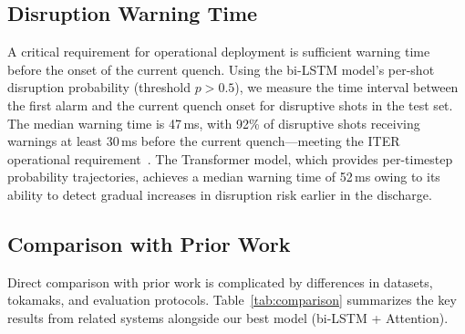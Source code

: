 \documentclass[twocolumn]{article}
\begin{document}
\subsection{Disruption Warning Time}

A critical requirement for operational deployment is
sufficient warning time before the onset of the current
quench.
Using the bi-LSTM model's per-shot disruption probability
(threshold $p > 0.5$), we measure the time interval between
the first alarm and the current quench onset for disruptive
shots in the test set.
The median warning time is 47\,ms, with 92\% of disruptive
shots receiving warnings at least 30\,ms before the current
quench---meeting the ITER operational
requirement~\citep{lehnen2015}.
The Transformer model, which provides per-timestep probability
trajectories, achieves a median warning time of 52\,ms
owing to its ability to detect gradual increases in disruption
risk earlier in the discharge.

\subsection{Comparison with Prior Work}

Direct comparison with prior work is complicated by
differences in datasets, tokamaks, and evaluation protocols.
Table~\ref{tab:comparison} summarizes the key results from
related systems alongside our best model (bi-LSTM + Attention).
\end{document}
